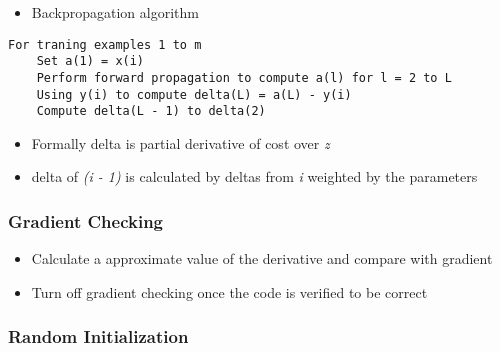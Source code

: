 \documentclass[]{article}
\newenvironment{Shaded}{}{}
\newcommand{\CommentTok}[1]{\textcolor[rgb]{0.38,0.63,0.69}{\textit{#1}}}
\newcommand{\FloatTok}[1]{\textcolor[rgb]{0.25,0.63,0.44}{#1}}
\newcommand{\NormalTok}[1]{#1}
\providecommand{\tightlist}{%
  \setlength{\itemsep}{0pt}\setlength{\parskip}{0pt}}
\begin{document}
\begin{itemize}
\tightlist
\item
  Backpropagation algorithm
\end{itemize}

\begin{verbatim}
For traning examples 1 to m
    Set a(1) = x(i)
    Perform forward propagation to compute a(l) for l = 2 to L
    Using y(i) to compute delta(L) = a(L) - y(i)
    Compute delta(L - 1) to delta(2)
\end{verbatim}

\begin{itemize}
\tightlist
\item
  Formally delta is partial derivative of cost over \emph{z}
\item
  delta of \emph{(i - 1)} is calculated by deltas from \emph{i} weighted
  by the parameters
\end{itemize}

\hypertarget{gradient-checking}{%
\subsubsection{Gradient Checking}\label{gradient-checking}}

\begin{itemize}
\tightlist
\item
  Calculate a approximate value of the derivative and compare with
  gradient
\end{itemize}

\begin{Shaded}
\end{Shaded}

\begin{itemize}
\tightlist
\item
  Turn off gradient checking once the code is verified to be correct
\end{itemize}

\hypertarget{random-initialization}{%
\subsubsection{Random Initialization}\label{random-initialization}}
\end{document}
